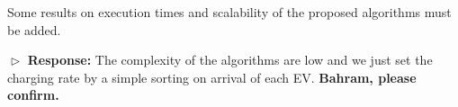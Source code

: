 \documentclass[11pt]{article}
\begin{document}

\vspace{3mm}
{\color{blue} Some results on execution times and scalability of the proposed algorithms must be added.
 }
\vspace{3mm}

$\vartriangleright$ \noindent\textbf{Response:} 
The complexity of the algorithms are low and we just set the charging rate by a simple sorting on arrival of each EV. \textbf{Bahram, please confirm.}

%
\end{document}
